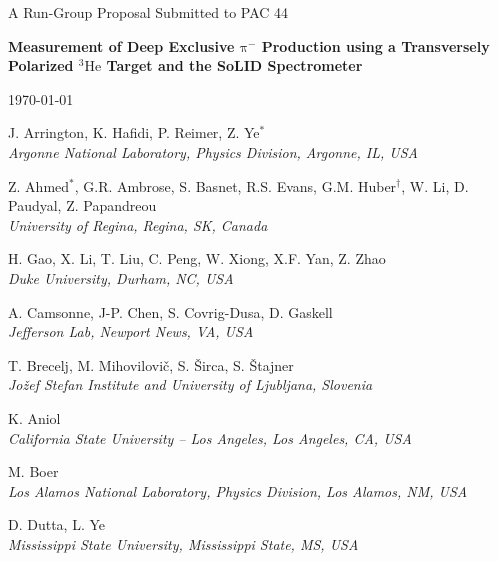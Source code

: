 \documentclass{article}
\begin{document}

\begin{center}

{\Huge A Run-Group Proposal Submitted to PAC 44}

\vspace*{25pt}

{\LARGE\bf
Measurement of Deep Exclusive $\mathrm\pi^-$ Production
using a Transversely Polarized $\mathrm{^{3}He}$ Target
and the SoLID Spectrometer}

\vspace*{3ex}
\today

\vspace*{30pt}

J. Arrington, K. Hafidi, P. Reimer, Z. Ye$^\ast$ \\
{\it Argonne National Laboratory, Physics Division, Argonne, IL, USA}
\vspace*{15pt}

Z. Ahmed$^\ast$, G.R. Ambrose, S. Basnet, R.S. Evans, G.M. Huber$^\dagger$,
W. Li, D. Paudyal, Z. Papandreou\\
{\it University of Regina, Regina, SK, Canada}
\vspace*{15pt}

H. Gao, X. Li, T. Liu, C. Peng, W. Xiong, X.F. Yan, Z. Zhao\\
{\it Duke University, Durham, NC, USA}
\vspace*{15pt}

A. Camsonne,  J-P. Chen, S. Covrig-Dusa, D. Gaskell\\
{\it  Jefferson Lab, Newport News, VA, USA}
\vspace*{15pt}

T. Brecelj, M. Mihovilovi\v{c}, S. \v{S}irca, S. \v{S}tajner\\
{\it Jo\v{z}ef Stefan Institute and University of Ljubljana, Slovenia}
\vspace*{15pt}

K. Aniol\\
{\it California State University -- Los Angeles, Los Angeles, CA, USA}
\vspace*{15pt}

M. Boer\\
{\it Los Alamos National Laboratory, Physics Division, Los Alamos, NM, USA}
\vspace*{15pt}

D. Dutta, L. Ye\\
{\it Mississippi State University, Mississippi State, MS, USA}
\vspace*{15pt}


\end{center}
\end{document}

